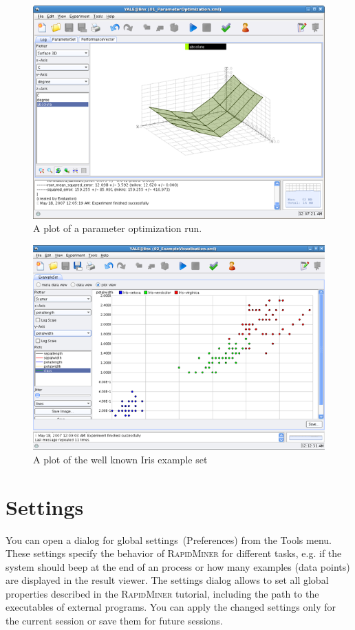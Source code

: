 \documentclass[11pt]{article}
\newcommand{\useroption}[1]{\textsf{#1}}
\newcommand{\rapidminer}{\protect \textsc{RapidMiner}\xspace}
\begin{document}
\begin{figure}[htbp]
\center
\includegraphics[width=0.88\linewidth]{screenshot_plot.png}
\caption{A plot of a parameter optimization run.}
\label{fig:screenshot_plot}
\end{figure}


\begin{figure}[htbp]
\center
\includegraphics[width=0.88\linewidth]{plot_iris.png}
\caption{A plot of the well known Iris example set}
\label{fig:plot_iris}
\end{figure}




\section{Settings}

You can open a dialog for global settings (Preferences) from the \useroption{Tools}
menu.
These settings specify the behavior of \rapidminer for different tasks, 
e.g. if the system should beep at the end of an process or how many 
examples (data points) are displayed in the result viewer. The settings 
dialog allows to set all global properties described in the \rapidminer 
tutorial, including the path to the executables of external programs. 
You can apply the changed settings only for the current session or 
save them for future sessions.
\end{document}

